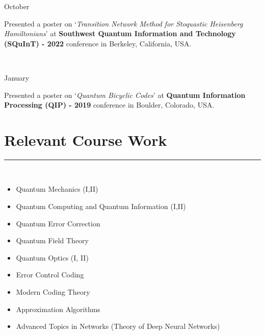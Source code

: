 \documentclass[10pt]{article}
\newcommand\vtick{\textquotesingle}
\begin{document}
\noindent
\begin{minipage}[t]{.2\textwidth}
October\vtick22
\end{minipage}
\begin{minipage}[t]{0.8\textwidth}
Presented a poster on `{\it Transition Network Method for Stoquastic Heisenberg Hamiltonians}' at {\bf Southwest Quantum Information and Technology (SQuInT) - 2022} conference in Berkeley, California, USA.
\end{minipage}\\

\noindent
\begin{minipage}[t]{.2\textwidth}
January\vtick19
\end{minipage}
\begin{minipage}[t]{0.8\textwidth}
Presented a poster on `{\it Quantum Bicyclic Codes}' at {\bf Quantum Information Processing (QIP) - 2019} conference in Boulder, Colorado, USA.
\end{minipage}

\vspace{0.125in}
\section*{\color{black} Relevant Course Work}
\noindent\textcolor{black}{\rule{\textwidth}{1.5pt}} \vspace{-0.2cm}\\
\begin{minipage}[t]{0.5\textwidth}
\begin{itemize}
    \setlength\itemsep{-.1em}
    \item Quantum Mechanics (I,II)
    \item Quantum Computing and Quantum Information (I,II)
    \item Quantum Error Correction
    \item Quantum Field Theory
    \item Quantum Optics (I, II)
\end{itemize}
\end{minipage}
\begin{minipage}[t]{0.5\textwidth}
\begin{itemize}
    \setlength\itemsep{-.1em}
    \item Error Control Coding
    \item Modern Coding Theory
    \item Approximation Algorithms
    \item Advanced Topics in Networks (Theory of Deep Neural Networks)
\end{itemize}
\end{minipage}
\end{document}
